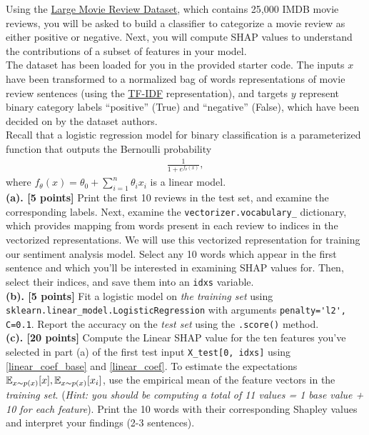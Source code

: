 Using the \href{https://ai.stanford.edu/~amaas/data/sentiment/}{Large Movie Review Dataset}, which contains 25,000 IMDB movie reviews, you will be asked to build a classifier to categorize a movie review as either positive or negative. Next, you will compute SHAP values to understand the contributions of a subset of features in your model.\\
The dataset has been loaded for you in the provided starter code. The inputs $x$ have been transformed to a normalized bag of words representations of movie review sentences (using the \href{https://en.wikipedia.org/wiki/Tf%E2%80%93idf}{TF-IDF} representation), and targets $y$ represent binary category labels ``positive'' (True) and ``negative'' (False), which have been decided on by the dataset authors. \\ 
Recall that a logistic regression model for binary classification is a parameterized function that outputs the Bernoulli probability
\begin{align*}
    \frac{1}{1 + e^{f_{\theta}(x)}},
\end{align*}
where $f_{\theta}(x) = \theta_0 + \sum_{i = 1}^{n} \theta_i x_i$ is a linear model. \\

\textbf{(a). [5 points]} Print the first 10 reviews in the test set, and examine the corresponding labels. Next, examine the \verb|vectorizer.vocabulary_| dictionary, which provides mapping from words present in each review to indices in the vectorized representations. We will use this vectorized representation for training our sentiment analysis model. Select any 10 words which appear in the first sentence and which you'll be interested in examining SHAP values for. Then, select their indices, and save them into an \verb|idxs| variable.\\

\textbf{(b). [5 points]} Fit a logistic model on \emph{the training set} using \verb|sklearn.linear_model.LogisticRegression| with arguments \verb|penalty='l2', C=0.1|. Report the accuracy on the \emph{test set} using the \verb|.score()| method. \\

\textbf{(c). [20 points]} Compute the Linear SHAP value for the ten features you've selected in part (a) of the first test input \verb|X_test[0, idxs]| using \eqref{linear_coef_base} and \eqref{linear_coef}. 
To estimate the expectations $\mathbb{E}_{x \sim p(x)}[x], \mathbb{E}_{x \sim p(x)}[x_i]$, use the empirical mean of the feature vectors in the \emph{training set}. (\emph{Hint: you should be computing a total of 11 values = 1 base value + 10 for each feature}). Print the 10 words with their corresponding Shapley values and interpret your findings (2-3 sentences). \\

